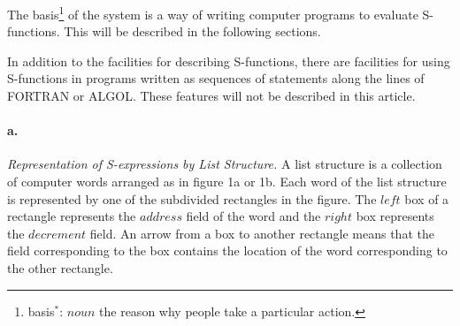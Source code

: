\documentclass[11pt, a4paper]{article}
\begin{document}
The
basis\footnote{basis$^*$: $noun$ the reason why people take a particular
  action.}
of the system is a way of writing computer programs to evaluate
S-functions. This will be described in the following sections.

In addition to the facilities for describing S-functions, there are facilities
for using S-functions in programs written as sequences of statements along the
lines of FORTRAN or ALGOL. These features will not be described in this
article.

\paragraph{a.}\textit{Representation of S-expressions by List Structure.}
A list structure is a collection of computer words arranged as in figure 1a or
1b. Each word of the list structure is represented by one of the subdivided
rectangles in the figure. The $left$ box of a rectangle represents the $address$
field of the word and the $right$ box represents the $decrement$ field. An arrow
from a box to another rectangle means that the field corresponding to the box
contains the location of the word corresponding to the other rectangle.
\end{document}
